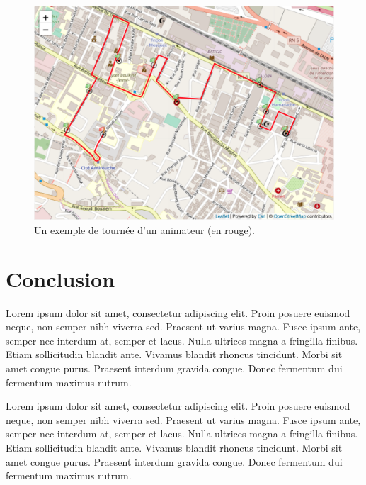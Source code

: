 \medskip

\begin{figure}[hbt!]
  \centering
  \includegraphics[height=8cm]{images_pfe/animator_route.png}
  \caption{Un exemple de tournée d'un animateur (en rouge).}
  \label{fig:tournee-animateur}
\end{figure}
\FloatBarrier


\medskip

\section{Conclusion}
Lorem ipsum dolor sit amet, consectetur adipiscing elit. Proin posuere euismod neque, non semper nibh viverra sed. Praesent ut varius magna. Fusce ipsum ante, semper nec interdum at, semper et lacus. Nulla ultrices magna a fringilla finibus. Etiam sollicitudin blandit ante. Vivamus blandit rhoncus tincidunt. Morbi sit amet congue purus. Praesent interdum gravida congue. Donec fermentum dui fermentum maximus rutrum.

\medskip

Lorem ipsum dolor sit amet, consectetur adipiscing elit. Proin posuere euismod neque, non semper nibh viverra sed. Praesent ut varius magna. Fusce ipsum ante, semper nec interdum at, semper et lacus. Nulla ultrices magna a fringilla finibus. Etiam sollicitudin blandit ante. Vivamus blandit rhoncus tincidunt. Morbi sit amet congue purus. Praesent interdum gravida congue. Donec fermentum dui fermentum maximus rutrum.






